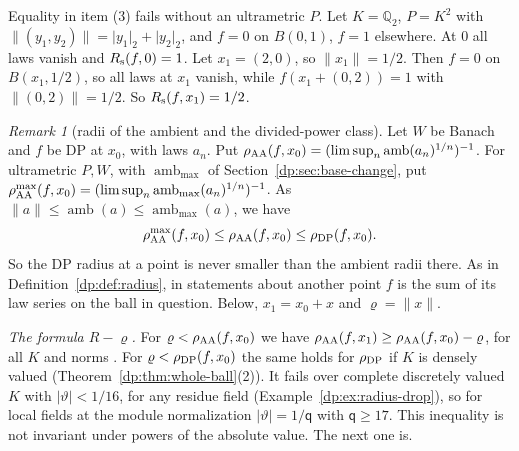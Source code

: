 \documentclass[11pt]{amsart}
\theoremstyle{definition}
\theoremstyle{remark}
\newtheorem{remark}[theorem]{Remark}
\numberwithin{equation}{section}
\newcommand{\abs}[1]{\lvert #1\rvert}
\newcommand{\norm}[1]{\lVert #1\rVert}
\theoremstyle{plain}
\theoremstyle{definition}
\theoremstyle{plain}
\begin{document}
Equality in item (3) fails without an ultrametric $P$. Let $K=\mathbb Q_2$, $P=K^2$ with $\norm{(y_1,y_2)}=\abs{y_1}_2+\abs{y_2}_2$, and $f=0$ on $B(0,1)$, $f=1$ elsewhere. At $0$ all laws vanish and $R_{\rm s}(f,0)=1$. Let $x_1=(2,0)$, so $\norm{x_1}=1/2$. Then $f=0$ on $B(x_1,1/2)$, so all laws at $x_1$ vanish, while $f(x_1+(0,2))=1$ with $\norm{(0,2)}=1/2$. So $R_{\rm s}(f,x_1)=1/2$.

\begin{remark}[radii of the ambient and the divided-power class]\label{dp:rem:radius-contrast}
Let $W$ be Banach and $f$ be DP at $x_0$, with laws $a_n$. Put $\rho_{\rm AA}(f,x_0)=(\limsup_n\operatorname{amb}(a_n)^{1/n})^{-1}$. For ultrametric $P,W$, with $\operatorname{amb}_{\max}$ of Section~\ref{dp:sec:base-change}, put $\rho^{\max}_{\rm AA}(f,x_0)=(\limsup_n\operatorname{amb}_{\max}(a_n)^{1/n})^{-1}$. As $\norm a\le\operatorname{amb}(a)\le\operatorname{amb}_{\max}(a)$, we have
\[
 \rho^{\max}_{\rm AA}(f,x_0)\le\rho_{\rm AA}(f,x_0)\le\rho_{\rm DP}(f,x_0).
\]
So the DP radius at a point is never smaller than the ambient radii there. As in Definition~\ref{dp:def:radius}, in statements about another point $f$ is the sum of its law series on the ball in question. Below, $x_1=x_0+x$ and $\varrho=\norm x$.

\emph{The formula $R-\varrho$.} For $\varrho<\rho_{\rm AA}(f,x_0)$ we have $\rho_{\rm AA}(f,x_1)\ge\rho_{\rm AA}(f,x_0)-\varrho$, for all $K$ and norms \cite[Propositions~14.9(1), 14.12(2)]{I}. For $\varrho<\rho_{\rm DP}(f,x_0)$ the same holds for $\rho_{\rm DP}$ if $K$ is densely valued (Theorem~\ref{dp:thm:whole-ball}(2)). It fails over complete discretely valued $K$ with $\abs\vartheta<1/16$, for any residue field (Example~\ref{dp:ex:radius-drop}), so for local fields at the module normalization $\abs\vartheta=1/\mathsf q$ with $\mathsf q\ge17$. This inequality is not invariant under powers of the absolute value. The next one is.


\end{remark}
\end{document}
